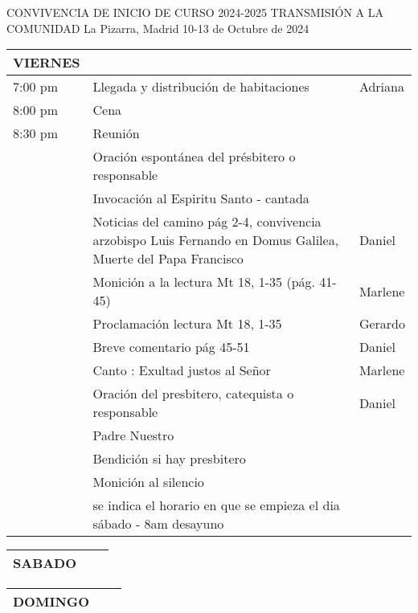 \documentclass[
  12pt,
]{article}
\author{}
\date{\vspace{-2.5em}}
\begin{document}
\begin{center}
CONVIVENCIA DE INICIO DE CURSO 2024-2025 \newline
TRANSMISIÓN A LA COMUNIDAD \newline
La Pizarra, Madrid 10-13 de Octubre de 2024 \newline
\end{center}

\begin{tabular}{|p{2cm}|p{12cm}|p{2cm}|}
\hline
VIERNES & &\\
\hline
7:00 pm & Llegada y distribución de habitaciones & Adriana \\
\hline
8:00 pm & Cena &\\
\hline
8:30 pm & Reunión & \\
& Oración espontánea del présbitero o responsable &\\ 
\newline
& Invocación al Espiritu Santo - cantada & \\ 
\newline
& Noticias del camino pág 2-4, convivencia arzobispo Luis Fernando en Domus Galilea, Muerte del Papa Francisco & Daniel \\ 
\newline
& Monición a la lectura Mt 18, 1-35 (pág. 41-45) &  Marlene\\ 
\newline
& Proclamación lectura Mt 18, 1-35 & Gerardo \\ 
\newline
& Breve comentario pág 45-51 & Daniel \\ 
\newline
& Canto : Exultad justos al Señor & Marlene \\ 
\newline
& Oración del presbitero, catequista o responsable & Daniel \\ 
\newline
& Padre Nuestro  & \\ 
\newline
& Bendición si hay presbitero & \\ 
\newline
& Monición al silencio & \\ 
\newline
& se indica el horario en que se empieza el dia sábado - 8am desayuno & \\ 
\hline
\end{tabular}

\begin{tabular}{|p{2cm}|p{12cm}|p{2cm}|}
\hline
SABADO & &\\

\hline
\end{tabular}

\begin{tabular}{|p{2cm}|p{12cm}|p{2cm}|}
\hline
DOMINGO & &\\

\hline
\end{tabular}
\end{document}
